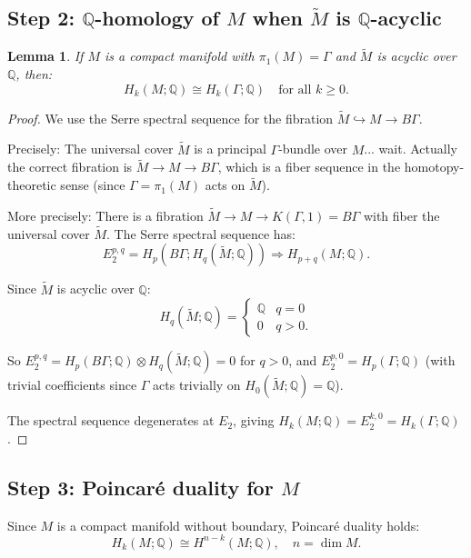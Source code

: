 \documentclass[12pt]{article}
\newtheorem{lemma}[theorem]{Lemma}
\begin{document}
\subsection{Step 2: $\mathbb{Q}$-homology of $M$ when $\widetilde{M}$ is $\mathbb{Q}$-acyclic}

\begin{lemma}\label{lem:serre-ss}
If $M$ is a compact manifold with $\pi_1(M) = \Gamma$ and $\widetilde{M}$ is acyclic over $\mathbb{Q}$, then:
\[
H_k(M; \mathbb{Q}) \cong H_k(\Gamma; \mathbb{Q}) \quad \text{for all } k \geq 0.
\]
\end{lemma}

\begin{proof}
We use the Serre spectral sequence for the fibration $\widetilde{M} \hookrightarrow M \to B\Gamma$.

Precisely: The universal cover $\widetilde{M}$ is a principal $\Gamma$-bundle over $M$... wait. Actually the correct fibration is $\widetilde{M} \to M \to B\Gamma$, which is a fiber sequence in the homotopy-theoretic sense (since $\Gamma = \pi_1(M)$ acts on $\widetilde{M}$).

More precisely: There is a fibration $\widetilde{M} \to M \to K(\Gamma, 1) = B\Gamma$ with fiber the universal cover $\widetilde{M}$. The Serre spectral sequence has:
\[
E_2^{p,q} = H_p(B\Gamma; H_q(\widetilde{M}; \mathbb{Q})) \Rightarrow H_{p+q}(M; \mathbb{Q}).
\]

Since $\widetilde{M}$ is acyclic over $\mathbb{Q}$:
\[
H_q(\widetilde{M}; \mathbb{Q}) = \begin{cases} \mathbb{Q} & q = 0 \\ 0 & q > 0. \end{cases}
\]

So $E_2^{p,q} = H_p(B\Gamma; \mathbb{Q}) \otimes H_q(\widetilde{M}; \mathbb{Q}) = 0$ for $q > 0$, and $E_2^{p,0} = H_p(\Gamma; \mathbb{Q})$ (with trivial coefficients since $\Gamma$ acts trivially on $H_0(\widetilde{M}; \mathbb{Q}) = \mathbb{Q}$).

The spectral sequence degenerates at $E_2$, giving $H_k(M; \mathbb{Q}) = E_2^{k,0} = H_k(\Gamma; \mathbb{Q})$.
\end{proof}

\subsection{Step 3: Poincar\'{e} duality for $M$}

Since $M$ is a compact manifold without boundary, Poincar\'{e} duality holds:
\[
H_k(M; \mathbb{Q}) \cong H^{n-k}(M; \mathbb{Q}), \quad n = \dim M.
\]
\end{document}
